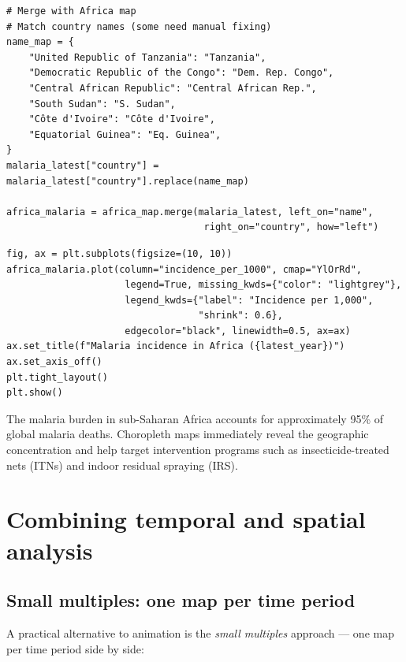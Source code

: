 \begin{verbatim}
# Merge with Africa map
# Match country names (some need manual fixing)
name_map = {
    "United Republic of Tanzania": "Tanzania",
    "Democratic Republic of the Congo": "Dem. Rep. Congo",
    "Central African Republic": "Central African Rep.",
    "South Sudan": "S. Sudan",
    "Côte d'Ivoire": "Côte d'Ivoire",
    "Equatorial Guinea": "Eq. Guinea",
}
malaria_latest["country"] = malaria_latest["country"].replace(name_map)

africa_malaria = africa_map.merge(malaria_latest, left_on="name",
                                   right_on="country", how="left")
\end{verbatim}

\begin{verbatim}
fig, ax = plt.subplots(figsize=(10, 10))
africa_malaria.plot(column="incidence_per_1000", cmap="YlOrRd",
                     legend=True, missing_kwds={"color": "lightgrey"},
                     legend_kwds={"label": "Incidence per 1,000",
                                  "shrink": 0.6},
                     edgecolor="black", linewidth=0.5, ax=ax)
ax.set_title(f"Malaria incidence in Africa ({latest_year})")
ax.set_axis_off()
plt.tight_layout()
plt.show()
\end{verbatim}

\begin{clinicalnote}
The malaria burden in sub-Saharan Africa accounts for approximately 95\% of global malaria deaths. Choropleth maps immediately reveal the geographic concentration and help target intervention programs such as insecticide-treated nets (ITNs) and indoor residual spraying (IRS).
\end{clinicalnote}

\section{Combining temporal and spatial analysis}

\subsection{Small multiples: one map per time period}

A practical alternative to animation is the \emph{small multiples} approach --- one map per time period side by side:

